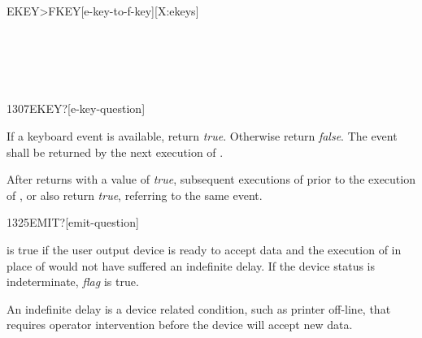 \begin{worddef}[EKEYtoFKEY]{}{EKEY>FKEY}[e-key-to-f-key][X:ekeys]
\begin{testing}
		 \\
		 \\

		 \\
	\end{testing}
\end{worddef}



\begin{worddef}[EKEYq]{1307}{EKEY?}[e-key-question]
\item {}

	If a keyboard event is available, return \emph{true}. Otherwise
	return \emph{false}. The event shall be returned by the next
	execution of .

	After  returns with a value of \emph{true},
	subsequent executions of  prior to the execution of
	,  or  also return
	\emph{true}, referring to the same event.
\end{worddef}


\begin{worddef}[EMITq]{1325}{EMIT?}[emit-question]
\item {}

	 is true if the user output device is ready to
	accept data and the execution of  in place of
	 would not have suffered an indefinite delay. If
	the device status is indeterminate, \emph{flag} is true.

	\begin{rationale} %
		An indefinite delay is a device related condition, such as
		printer off-line, that requires operator intervention before
		the device will accept new data.
	\end{rationale}
\end{worddef}


